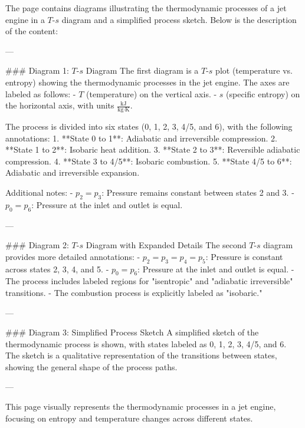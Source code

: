 The page contains diagrams illustrating the thermodynamic processes of a jet engine in a \( T \)-\( s \) diagram and a simplified process sketch. Below is the description of the content:

---

### Diagram 1: \( T \)-\( s \) Diagram  
The first diagram is a \( T \)-\( s \) plot (temperature vs. entropy) showing the thermodynamic processes in the jet engine. The axes are labeled as follows:  
- \( T \) (temperature) on the vertical axis.  
- \( s \) (specific entropy) on the horizontal axis, with units \( \frac{\text{kJ}}{\text{kg·K}} \).  

The process is divided into six states (0, 1, 2, 3, 4/5, and 6), with the following annotations:  
1. **State 0 to 1**: Adiabatic and irreversible compression.  
2. **State 1 to 2**: Isobaric heat addition.  
3. **State 2 to 3**: Reversible adiabatic compression.  
4. **State 3 to 4/5**: Isobaric combustion.  
5. **State 4/5 to 6**: Adiabatic and irreversible expansion.  

Additional notes:  
- \( p_2 = p_3 \): Pressure remains constant between states 2 and 3.  
- \( p_0 = p_6 \): Pressure at the inlet and outlet is equal.  

---

### Diagram 2: \( T \)-\( s \) Diagram with Expanded Details  
The second \( T \)-\( s \) diagram provides more detailed annotations:  
- \( p_2 = p_3 = p_4 = p_5 \): Pressure is constant across states 2, 3, 4, and 5.  
- \( p_0 = p_6 \): Pressure at the inlet and outlet is equal.  
- The process includes labeled regions for "isentropic" and "adiabatic irreversible" transitions.  
- The combustion process is explicitly labeled as "isobaric."  

---

### Diagram 3: Simplified Process Sketch  
A simplified sketch of the thermodynamic process is shown, with states labeled as 0, 1, 2, 3, 4/5, and 6. The sketch is a qualitative representation of the transitions between states, showing the general shape of the process paths.

---

This page visually represents the thermodynamic processes in a jet engine, focusing on entropy and temperature changes across different states.